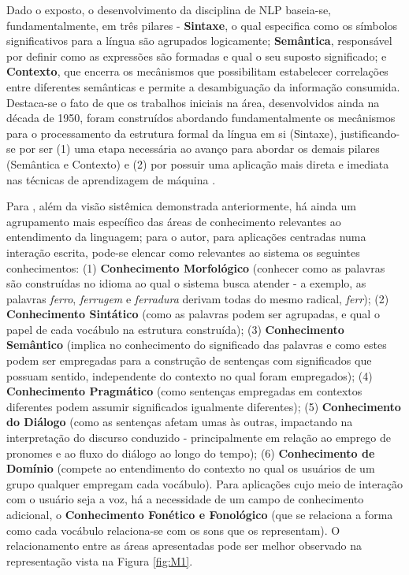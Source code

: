 Dado o exposto, o desenvolvimento da disciplina de NLP baseia-se, fundamentalmente, em três pilares - \textbf{Sintaxe}, o qual especifica como os símbolos significativos para a língua são agrupados logicamente; \textbf{Semântica}, responsável por definir como as expressões são formadas e qual o seu suposto significado; e \textbf{Contexto}, que encerra os mecânismos que possibilitam estabelecer correlações entre diferentes semânticas e permite a desambiguação da informação consumida. Destaca-se o fato de que os trabalhos iniciais na área, desenvolvidos ainda na década de 1950, foram construídos abordando fundamentalmente os mecânismos para o processamento da estrutura formal da língua em si (Sintaxe), justificando-se por ser (1) uma etapa necessária ao avanço para abordar os demais pilares (Semântica e Contexto) e (2) por possuir uma aplicação mais direta e imediata nas técnicas de aprendizagem de máquina \cite{cambria2014jumping}.



Para , além da visão sistêmica demonstrada anteriormente, há ainda um agrupamento mais específico das áreas de conhecimento relevantes ao entendimento da linguagem; para o autor, para aplicações centradas numa interação escrita, pode-se elencar como relevantes ao sistema os seguintes conhecimentos: (1) \textbf{Conhecimento Morfológico} (conhecer como as palavras são construídas no idioma ao qual o sistema busca atender - a exemplo, as palavras \textit{ferro}, \textit{ferrugem} e \textit{ferradura} derivam todas do mesmo radical, \textit{ferr}); (2) \textbf{Conhecimento Sintático} (como as palavras podem ser agrupadas, e qual o papel de cada vocábulo na estrutura construída); (3) \textbf{Conhecimento Semântico} (implica no conhecimento do significado das palavras e como estes podem ser empregadas para a construção de sentenças com significados que possuam sentido, independente do contexto no qual foram empregados); (4) \textbf{Conhecimento Pragmático} (como sentenças empregadas em contextos diferentes podem assumir significados igualmente diferentes); (5) \textbf{Conhecimento do Diálogo} (como as sentenças afetam umas às outras, impactando na interpretação do discurso conduzido - principalmente em relação ao emprego de pronomes e ao fluxo do diálogo ao longo do tempo); (6) \textbf{Conhecimento de Domínio} (compete ao entendimento do contexto no qual os usuários de um grupo qualquer empregam cada vocábulo). Para aplicações cujo meio de interação com o usuário seja a voz, há a necessidade de um campo de conhecimento adicional, o \textbf{Conhecimento Fonético e Fonológico} (que se relaciona a forma como cada vocábulo relaciona-se com os sons que os representam). O relacionamento entre as áreas apresentadas pode ser melhor observado na representação vista na Figura \ref{fig:M1}.

